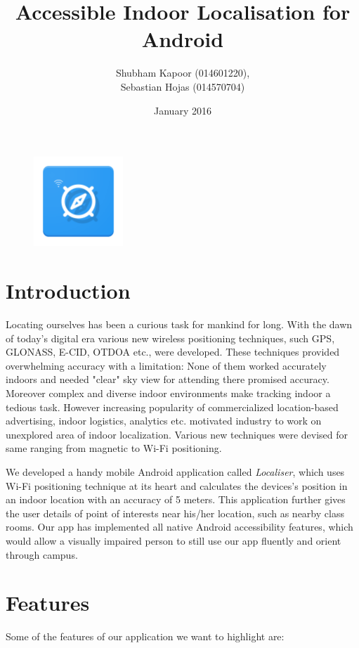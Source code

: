 \documentclass{article}
\title{Accessible Indoor Localisation for Android}
\author{Shubham Kapoor (014601220), \\Sebastian Hojas (014570704)}
\date{January 2016}
\begin{document}
\begin{figure}
    \centering
    \includegraphics[width=0.3\textwidth]{icon}
    \label{fig:icon}
\end{figure}

\maketitle

\section{Introduction}
Locating ourselves has been a curious task for mankind for long. With the dawn of today's digital era various new wireless positioning techniques, such GPS, GLONASS, E-CID, OTDOA etc., were developed. These techniques provided overwhelming accuracy with a limitation: None of them worked accurately indoors and needed "clear" sky view for attending there promised accuracy. Moreover complex and diverse indoor environments make tracking indoor a tedious task. However increasing popularity of commercialized location-based advertising, indoor logistics, analytics etc. motivated industry to work on unexplored area of indoor localization. Various new techniques were devised for same ranging from magnetic to Wi-Fi positioning.

We developed a handy mobile Android application called \textit{Localiser}, which uses Wi-Fi positioning technique at its heart and calculates the devices's position in an indoor location with an accuracy of 5 meters. This application further gives the user details of point of interests near his/her location, such as nearby class rooms. Our app has implemented all native Android accessibility features, which would allow a visually impaired person to still use our app fluently and orient through campus.

\section{Features}

Some of the features of our application we want to highlight are:
\end{document}
